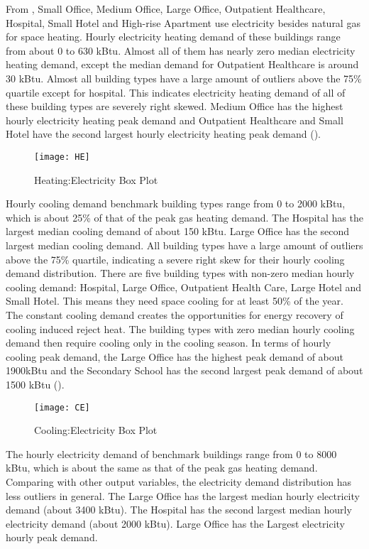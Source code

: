 From , Small Office, Medium Office, Large Office,
Outpatient Healthcare, Hospital, Small Hotel and High-rise Apartment
use electricity besides natural gas for space heating. Hourly
electricity heating demand of these buildings range from about 0 to
630 kBtu. Almost all of them has nearly zero median electricity
heating demand, except the median demand for Outpatient Healthcare is
around 30 kBtu. Almost all building types have a large amount of
outliers above the 75\% quartile except for hospital. This indicates
electricity heating demand of all of these building types are severely
right skewed. Medium Office has the highest hourly electricity heating
peak demand and Outpatient Healthcare and Small Hotel have the second
largest hourly electricity heating peak demand ().

\begin{figure}[h!]
  \centering
  \texttt{[image: HE]}
  \caption[Heating:Electricity Box Plot]{Heating:Electricity Box Plot}
  \label{fig:HE}
\end{figure}%

Hourly cooling demand benchmark building types range from 0 to 2000
kBtu, which is about 25\% of that of the peak gas heating demand. The
Hospital has the largest median cooling demand of about 150
kBtu. Large Office has the second largest median cooling demand. All
building types have a large amount of outliers above the 75\%
quartile, indicating a severe right skew for their hourly cooling
demand distribution. There are five building types with non-zero
median hourly cooling demand: Hospital, Large Office, Outpatient
Health Care, Large Hotel and Small Hotel. This means they need space
cooling for at least 50\% of the year. The constant cooling demand
creates the opportunities for energy recovery of cooling induced
reject heat. The building types with zero median hourly cooling demand
then require cooling only in the cooling season. In terms of hourly
cooling peak demand, the Large Office has the highest peak demand of
about 1900kBtu and the Secondary School has the second largest peak
demand of about 1500 kBtu ().
\begin{figure}[h!]
  \centering
  \texttt{[image: CE]}
  \caption[Cooling:Electricity Box Plot]{Cooling:Electricity Box Plot}
  \label{fig:CE}
\end{figure}%

The hourly electricity demand of benchmark buildings range from 0 to
8000 kBtu, which is about the same as that of the peak gas heating
demand. Comparing with other output variables, the electricity demand
distribution has less outliers in general. The Large Office has the
largest median hourly electricity demand (about 3400 kBtu). The
Hospital has the second largest median hourly electricity demand
(about 2000 kBtu). Large Office has the Largest electricity hourly
peak demand.

